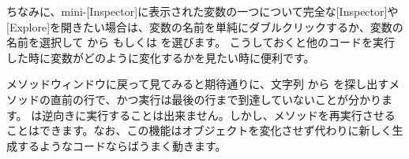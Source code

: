\documentclass[a4paper,10pt,twoside]{book}
\begin{document}
ちなみに、mini-[Inspector]に表示された変数の一つについて完全な[Inspector]や[Explore]を開きたい場合は、変数の名前を単純にダブルクリックするか、変数の名前を選択して \actclick から  もしくは  を選びます。
こうしておくと他のコードを実行した時に変数がどのように変化するかを見たい時に便利です。

メソッドウィンドウに戻って見てみると期待通りに、文字列  から  を探し出すメソッドの直前の行で、かつ実行は最後の行まで到達していないことが分かります。
\pharo は逆向きに実行することは出来ません。しかし、メソッドを再実行させることはできます。なお、この機能はオブジェクトを変化させず代わりに新しく生成するようなコードならばうまく動きます。

\end{document}
